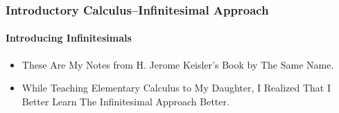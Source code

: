 \begin{frame}
\frametitle{Introductory Calculus--Infinitesimal Approach}
\framesubtitle{Introducing Infinitesimals}
\label{slide:intro-01}
\begin{itemize}
\item These Are My Notes from H. Jerome Keisler's Book by The Same Name.
\pause\item While Teaching Elementary Calculus to My Daughter, I Realized That I Better Learn The Infinitesimal Approach Better.
\end{itemize}
\end{frame}
